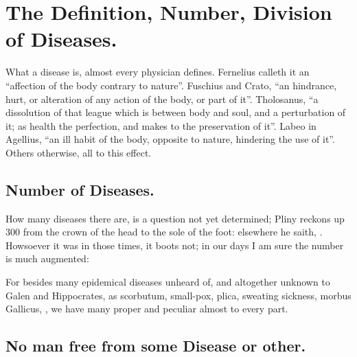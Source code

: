 \section{The Definition, Number, Division of Diseases.}

What a disease is, almost every physician defines.
Fernelius calleth it an \enquote{affection of the body contrary to
nature}. Fuschius and Crato, \enquote{an hindrance, hurt, or
alteration of any action of the body, or part of it}.
Tholosanus, \enquote{a dissolution of that league which is between
body and soul, and a perturbation of it; as health the perfection, and makes to
the preservation of it}. Labeo in Agellius, \enquote{an ill habit
of the body, opposite to nature, hindering the use of it}. Others otherwise,
all to this effect.

\subsection{Number of Diseases.}

How many diseases there are, is a question not yet determined;
Pliny reckons up 300 from the crown of the head to the sole
of the foot: elsewhere he saith, . Howsoever it was in those times, it boots not; in our days I am
sure the number is much augmented:


For besides many epidemical diseases unheard of, and altogether unknown to
Galen and Hippocrates, as scorbutum, small-pox, plica, sweating sickness,
morbus Gallicus, \etc{}, we have many proper and peculiar almost to every part.

\subsection{No man free from some Disease or other.}

